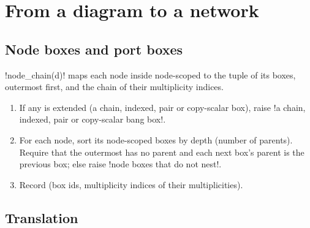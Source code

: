 {\section{From a diagram to a network}\label{sec:lean-export-net-translate}

\subsection{Node boxes and port boxes}\label{sec:lean-export-net-boxes}

\py!node_chain(d)! maps each node inside node-scoped \bboxes{} to the tuple of its boxes,
outermost first, and the chain of their multiplicity indices.

\begin{algorithm}\label{alg:lean-export-net-node-chain}
\begin{enumerate}
\item If any \bbox{} is extended (a chain, indexed, pair or copy-scalar box), raise
  \code!a chain, indexed, pair or copy-scalar bang box!.
\item For each node, sort its node-scoped boxes by depth (number of parents). Require that the
  outermost has no parent and each next box's parent is the previous box; else raise
  \code!node boxes that do not nest!.
\item Record (box ids, multiplicity indices of their multiplicities).
\end{enumerate}
\end{algorithm}

\subsection{Translation}\label{sec:lean-export-net-translate-alg}

}
